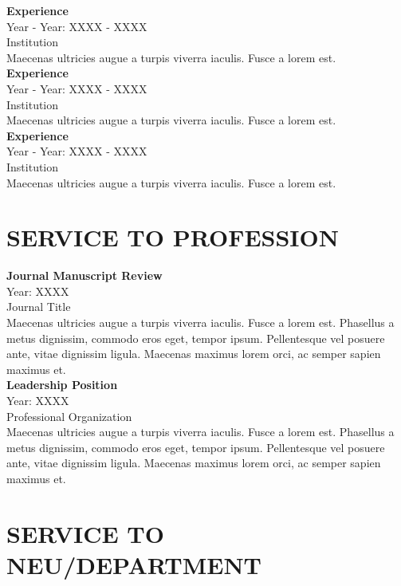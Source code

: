 \documentclass{article}
\begin{document}
\noindent
\newline
\textbf{Experience} \\
Year - Year: XXXX - XXXX \\
Institution\\
Maecenas ultricies augue a turpis viverra iaculis. Fusce a lorem est. \\

\noindent
\textbf{Experience} \\
Year - Year: XXXX - XXXX \\
Institution\\
Maecenas ultricies augue a turpis viverra iaculis. Fusce a lorem est. \\

\noindent
\textbf{Experience} \\
Year - Year: XXXX - XXXX \\
Institution\\
Maecenas ultricies augue a turpis viverra iaculis. Fusce a lorem est.


\section*{SERVICE TO PROFESSION}

\noindent
\newline
\textbf{Journal Manuscript Review} \\
Year: XXXX \\
Journal Title \\
Maecenas ultricies augue a turpis viverra iaculis. Fusce a lorem est. Phasellus a metus dignissim, commodo eros eget, tempor ipsum. Pellentesque vel posuere ante, vitae dignissim ligula. Maecenas maximus lorem orci, ac semper sapien maximus et. \\

\noindent
\textbf{Leadership Position} \\
Year: XXXX \\
Professional Organization \\
Maecenas ultricies augue a turpis viverra iaculis. Fusce a lorem est. Phasellus a metus dignissim, commodo eros eget, tempor ipsum. Pellentesque vel posuere ante, vitae dignissim ligula. Maecenas maximus lorem orci, ac semper sapien maximus et. 


\section*{SERVICE TO NEU/DEPARTMENT}
\end{document}
